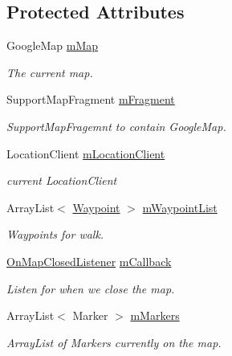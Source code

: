 \subsection*{Protected Attributes}
\begin{DoxyCompactItemize}
\item 
Google\+Map \hyperlink{classuk_1_1ac_1_1swan_1_1digitaltrails_1_1fragments_1_1_map_fragment_abc99770043e7270d681a55162785a5a4}{m\+Map}
\begin{DoxyCompactList}\small\item\em The current map. \end{DoxyCompactList}\item 
Support\+Map\+Fragment \hyperlink{classuk_1_1ac_1_1swan_1_1digitaltrails_1_1fragments_1_1_map_fragment_a39598ad7b75cd75ef1454af3e394edc6}{m\+Fragment}
\begin{DoxyCompactList}\small\item\em Support\+Map\+Fragemnt to contain Google\+Map. \end{DoxyCompactList}\item 
Location\+Client \hyperlink{classuk_1_1ac_1_1swan_1_1digitaltrails_1_1fragments_1_1_map_fragment_a906e60065eeb311eb30b372edb2f1447}{m\+Location\+Client}
\begin{DoxyCompactList}\small\item\em current Location\+Client \end{DoxyCompactList}\item 
Array\+List$<$ \hyperlink{classuk_1_1ac_1_1swan_1_1digitaltrails_1_1components_1_1_waypoint}{Waypoint} $>$ \hyperlink{classuk_1_1ac_1_1swan_1_1digitaltrails_1_1fragments_1_1_map_fragment_a6c44ef7f0370cc0a699c1cbe80f8c30e}{m\+Waypoint\+List}
\begin{DoxyCompactList}\small\item\em Waypoints for walk. \end{DoxyCompactList}\item 
\hyperlink{interfaceuk_1_1ac_1_1swan_1_1digitaltrails_1_1fragments_1_1_map_fragment_1_1_on_map_closed_listener}{On\+Map\+Closed\+Listener} \hyperlink{classuk_1_1ac_1_1swan_1_1digitaltrails_1_1fragments_1_1_map_fragment_a18de48be0fcafe966225e7f95feace5a}{m\+Callback}
\begin{DoxyCompactList}\small\item\em Listen for when we close the map. \end{DoxyCompactList}\item 
Array\+List$<$ Marker $>$ \hyperlink{classuk_1_1ac_1_1swan_1_1digitaltrails_1_1fragments_1_1_map_fragment_a00d1c005124f882b1b83a6190a6df9b3}{m\+Markers}
\begin{DoxyCompactList}\small\item\em Array\+List of Markers currently on the map. \end{DoxyCompactList}\end{DoxyCompactItemize}
